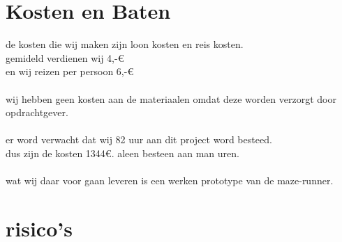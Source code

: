\documentclass[oneside]{book}
\begin{document}
\chapter{Kosten en Baten}
de kosten die wij maken zijn loon kosten en reis kosten.\\
gemideld verdienen wij 4,-\euro{} \\
en wij reizen per persoon 6,-\euro{} \\ 
\\
wij hebben geen kosten aan de materiaalen omdat deze worden verzorgt door opdrachtgever.\\
\\
er word verwacht dat wij 82 uur aan dit project word besteed.\\
dus zijn de kosten 1344\euro{}. aleen besteen aan man uren.\\
\\
wat wij daar voor gaan leveren is een werken prototype van de maze-runner.
\clearpage
\chapter{risico's}

\clearpage
\end{document}
